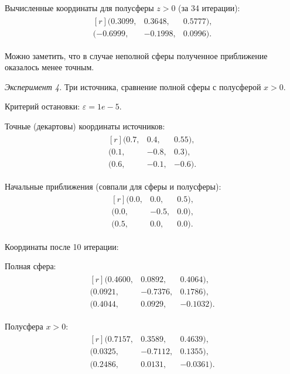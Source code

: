 Вычисленные координаты для полусферы $z > 0$ (за 34 итерации):
\begin{align*}
    \begin{matrix*}[r]
    (0.3099, & 0.3648, & 0.5777) \text{,}\\
    (-0.6999, & -0.1998, & 0.0996) \text{.}
    \end{matrix*}
\end{align*}

Можно заметить, что в случае неполной сферы полученное приближение оказалось менее точным.

\emph{Эксперимент 4.} Три источника, сравнение полной сферы с полусферой $x > 0$.

Критерий остановки: $\varepsilon = 1e-5$.

Точные (декартовы) координаты источников:
\begin{align*}
    \begin{matrix*}[r]
    (0.7, & 0.4, & 0.55) \text{,}\\
    (0.1, & -0.8, & 0.3) \text{,}\\
    (0.6, & -0.1, & -0.6) \text{.}
    \end{matrix*}
\end{align*}

Начальные приближения (совпали для сферы и полусферы):
\begin{align*}
    \begin{matrix*}[r]
    (0.0, & 0.0, & 0.5) \text{,}\\
    (0.0, & -0.5, & 0.0) \text{,}\\
    (0.5, & 0.0, & 0.0) \text{.}
    \end{matrix*}
\end{align*}

Координаты после 10 итерации:

Полная сфера:
\begin{align*}
    \begin{matrix*}[r]
    (0.4600, & 0.0892, & 0.4064) \text{,}\\
    (0.0921, & -0.7376, & 0.1786) \text{,}\\
    (0.4044, & 0.0929, & -0.1032) \text{.}
    \end{matrix*}
\end{align*}

Полусфера $x > 0$:
\begin{align*}
    \begin{matrix*}[r]
    (0.7157, & 0.3589, & 0.4639) \text{,}\\
    (0.0325, & -0.7112, & 0.1355) \text{,}\\
    (0.2486, & 0.0131, & -0.0361) \text{.}
    \end{matrix*}
\end{align*}

